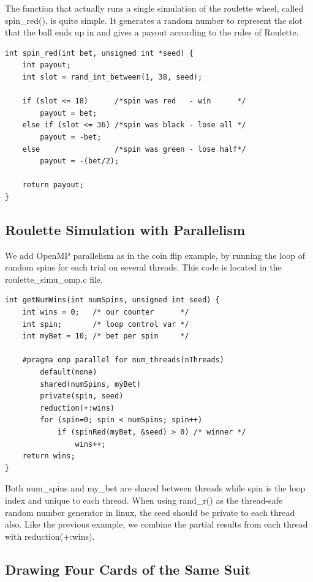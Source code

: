 \documentclass[a4paper, 11pt]{article}
\begin{document}
The function that actually runs a single simulation of the roulette wheel, called spin\_red(), is quite simple. It generates a random number to represent the slot that the ball ends up in and gives a payout according to the rules of Roulette.

\lstset{language=C}
\begin{lstlisting}[frame=single]
int spin_red(int bet, unsigned int *seed) {
    int payout;
    int slot = rand_int_between(1, 38, seed);

    if (slot <= 18)      /*spin was red   - win      */
        payout = bet;
    else if (slot <= 36) /*spin was black - lose all */
        payout = -bet;
    else                 /*spin was green - lose half*/
        payout = -(bet/2);
        
    return payout;
}
\end{lstlisting}

\pagebreak

\subsection{Roulette Simulation with Parallelism}

We add OpenMP parallelism as in the coin flip example, by running the loop of random spins for each trial on several threads. This code is located in the roulette\_simu\_omp.c file.

\lstset{language=C}
\begin{lstlisting}[frame=single]
int getNumWins(int numSpins, unsigned int seed) {
    int wins = 0;   /* our counter      */
    int spin;       /* loop control var */
    int myBet = 10; /* bet per spin     */

    #pragma omp parallel for num_threads(nThreads)
        default(none)
        shared(numSpins, myBet)
        private(spin, seed)
        reduction(+:wins)
        for (spin=0; spin < numSpins; spin++)
            if (spinRed(myBet, &seed) > 0) /* winner */
                wins++;  
    return wins;
}
\end{lstlisting}

Both num\_spins and my\_bet are shared between threads while spin is the loop index and unique to each thread. When using rand\_r() as the thread-safe random number generator in linux, the seed should be private to each thread also. Like the previous example, we combine the partial results from each thread with reduction(+:wins).

\subsection{Drawing Four Cards of the Same Suit}
\end{document}
